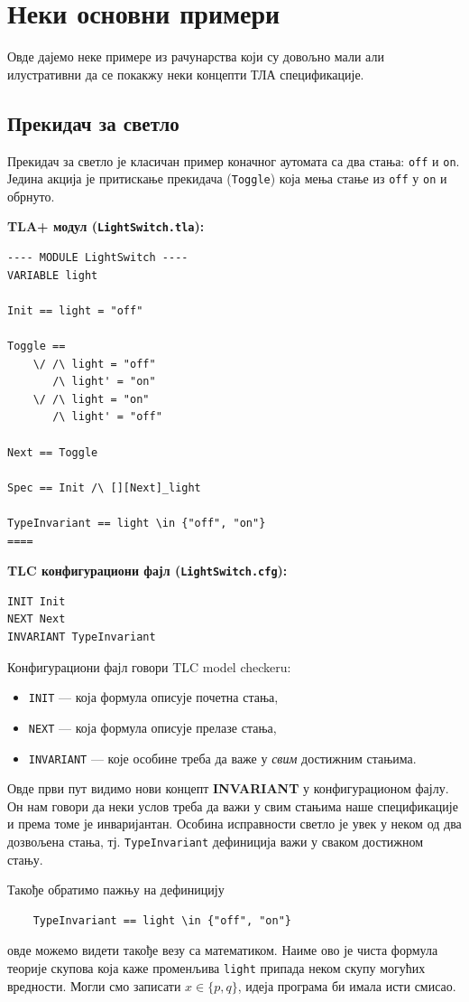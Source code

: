 \section{Неки основни примери}
Овде дајемо неке примере из рачунарства који су довољно мали али илустративни да се покакжу неки концепти ТЛА
спецификације.

\subsection{Прекидач за светло}
\begin{primer}
Прекидач за светло је класичан пример коначног аутомата са два стања: \texttt{off} и \texttt{on}.
Једина акција је притискање прекидача (\texttt{Toggle}) која мења стање из \texttt{off} у \texttt{on} и обрнуто.

\textbf{TLA+ модул (\texttt{LightSwitch.tla}):}
\begin{lstlisting}
---- MODULE LightSwitch ----
VARIABLE light

Init == light = "off"

Toggle ==
    \/ /\ light = "off"
       /\ light' = "on"
    \/ /\ light = "on"
       /\ light' = "off"

Next == Toggle

Spec == Init /\ [][Next]_light

TypeInvariant == light \in {"off", "on"}
====
\end{lstlisting}


\textbf{TLC конфигурациони фајл (\texttt{LightSwitch.cfg}):}
\begin{lstlisting}
INIT Init
NEXT Next
INVARIANT TypeInvariant
\end{lstlisting}

Конфигурациони фајл говори TLC model checkeru:
\begin{itemize}
    \item \texttt{INIT} --- која формула описује почетна стања,
    \item \texttt{NEXT} --- која формула описује прелазе стања,
    \item \texttt{INVARIANT} --- које особине треба да важе у \emph{свим} достижним стањима.
\end{itemize}
Овде први пут видимо нови концепт \textbf{INVARIANT} у конфигурационом фајлу. Он нам говори да неки услов
треба да важи у свим стањима наше спецификације и према томе је инваријантан. 
Особина исправности светло је увек у неком од два дозвољена стања, тј. \texttt{TypeInvariant} дефиниција важи у сваком достижном стању.
    
Такође обратимо пажњу на дефиницију 
\begin{lstlisting}
    TypeInvariant == light \in {"off", "on"}
\end{lstlisting}
овде можемо видети такође везу са математиком. Наиме ово је чиста формула теорије скупова која каже променљива \texttt{light}
припада неком скупу могућих вредности. Могли смо записати $x \in \{p, q\}$, идеја програма би имала исти смисао.
\end{primer}

